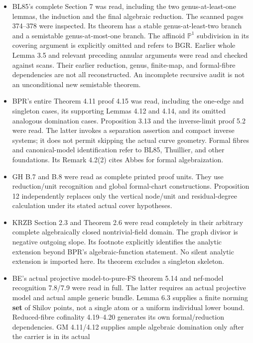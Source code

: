 \documentclass[
  11pt,
]{article}
\providecommand{\tightlist}{%
  \setlength{\itemsep}{0pt}\setlength{\parskip}{0pt}}
\begin{document}
\begin{itemize}
\tightlist
\item
  BL85's complete Section 7 was read, including the two
  genus-at-least-one lemmas, the induction and the final algebraic
  reduction. The scanned pages 374--378 were inspected. Its theorem has
  a stable genus-at-least-two branch and a semistable genus-at-most-one
  branch. The affinoid \(\mathbb P^1\) subdivision in its covering
  argument is explicitly omitted and refers to BGR. Earlier whole Lemma
  3.5 and relevant preceding annular arguments were read and checked
  against scans. Their earlier reduction, genus, finite-map, and
  formal-fibre dependencies are not all reconstructed. An incomplete
  recursive audit is not an unconditional new semistable theorem.
\item
  BPR's entire Theorem 4.11 proof 4.15 was read, including the one-edge
  and singleton cases, its supporting Lemmas 4.12 and 4.14, and its
  omitted analogous domination cases. Proposition 3.13 and the
  inverse-limit proof 5.2 were read. The latter invokes a separation
  assertion and compact inverse systems; it does not permit skipping the
  actual curve geometry. Formal fibres and canonical-model
  identification refer to BL85, Thuillier, and other foundations. Its
  Remark 4.2(2) cites Abbes for formal algebraization.
\item
  GH B.7 and B.8 were read as complete printed proof units. They use
  reduction/unit recognition and global formal-chart constructions.
  Proposition 12 independently replaces only the vertical node/unit and
  residual-degree calculation under its stated actual cover hypotheses.
\item
  KRZB Section 2.3 and Theorem 2.6 were read completely in their
  arbitrary complete algebraically closed nontrivial-field domain. The
  graph divisor is negative outgoing slope. Its footnote explicitly
  identifies the analytic extension beyond BPR's algebraic-function
  statement. No silent analytic extension is imported here. Its theorem
  excludes a singleton skeleton.
\item
  BE's actual projective model-to-pure-FS theorem 5.14 and nef-model
  recognition 7.8/7.9 were read in full. The latter requires an actual
  projective model and actual ample generic bundle. Lemma 6.3 supplies a
  finite norming \textbf{set} of Shilov points, not a single atom or a
  uniform individual lower bound. Reduced-fibre cofinality 4.19--4.20
  generates its own formal/reduction dependencies. GM 4.11/4.12 supplies
  ample algebraic domination only after the carrier is in its actual

\end{itemize}
\end{document}
